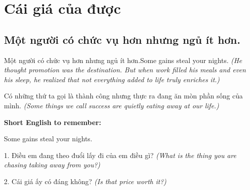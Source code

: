 \chapter{Cái giá của được}

\section{Một người có chức vụ hơn nhưng ngủ ít hơn.}
\begin{truyen}{Một người có chức vụ hơn nhưng ngủ ít hơn.}{Some gains steal your nights.}
\textit{(He thought promotion was the destination. But when work filled his meals and even his sleep, he realized that not everything added to life truly enriches it.)}
\end{truyen}
\begin{baihoc}
Có những thứ ta gọi là thành công nhưng thực ra đang ăn mòn phần sống của mình.
\textit{(Some things we call success are quietly eating away at our life.)}
\end{baihoc}
\begin{ghinhoanh}\textbf{Short English to remember:}

Some gains steal your nights.
\end{ghinhoanh}
\begin{tuhocnhanh}
1. Điều em đang theo đuổi lấy đi của em điều gì? \textit{(What is the thing you are chasing taking away from you?)}

2. Cái giá ấy có đáng không? \textit{(Is that price worth it?)}
\end{tuhocnhanh}
\ngancach

